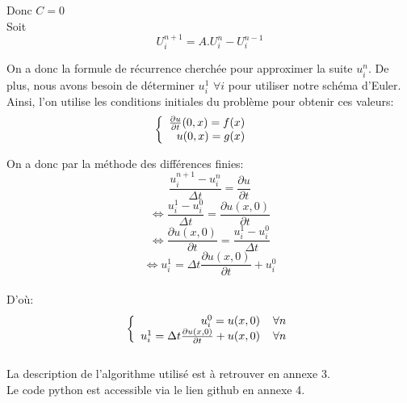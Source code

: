 Donc $C = 0$\\

Soit
\begin{equation*}
\boxed{
U^{n+1}_i = A.U^{n}_i - U^{n-1}_i}
\end{equation*}

On a donc la formule de récurrence cherchée pour approximer la suite $u^n_i$.
\newline
\newline
De plus, nous avons besoin de déterminer $u^1_i$ $\forall i$ pour utiliser notre schéma d'Euler. Ainsi, l'on utilise les conditions initiales du problème pour obtenir ces valeurs:
\begin{equation*}
\left \{
\begin{array}{rcl}
\frac{\partial u}{\partial t} (0,x) = f(x)\hspace*{4 mm}\\
 u(0,x) = g(x) \hspace*{4 mm} \\
\end{array}
\right.
\end{equation*}

On a donc par la méthode des différences finies:
\begin{equation*}
\frac{u^{n+1}_{i} - u^{n}_{i}}{\Delta t} = \frac{\partial u}{\partial t}
\end{equation*}
\begin{equation*}
\Leftrightarrow \frac{u^{1}_{i} - u^{0}_{i}}{\Delta t} = \frac{\partial u(x,0)}{\partial t}
\end{equation*}
\begin{equation*}
\Leftrightarrow \frac{\partial u(x,0)}{\partial t} = \frac{u^{1}_{i} - u^{0}_{i}}{\Delta t}
\end{equation*}
\begin{equation*}
\Leftrightarrow u^{1}_{i} = \Delta t \frac{\partial u(x,0)}{\partial t} + u^{0}_{i}
\end{equation*}\\
D'où:
\begin{equation*}
\left \{
\begin{array}{rcl}
u^0_i = u(x,0) \hspace*{4 mm} \forall n\\
u^1_i = \Delta t \frac{\partial u(x,0)}{\partial t} + u(x,0) \hspace*{4 mm} \forall n\\
\end{array}
\right.
\end{equation*}
\\
La description de l'algorithme utilisé est à retrouver en annexe 3.\\ Le code python est accessible via le lien github en annexe 4.

